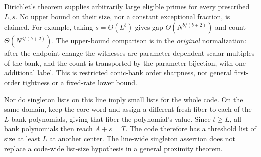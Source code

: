 Dirichlet's theorem supplies arbitrarily large eligible primes for every
prescribed $L,s$. No upper bound on their size, nor a constant exceptional
fraction, is claimed. For example, taking $s=\Theta(L^b)$ gives gap
$\Theta(N^{b/(b+2)})$ and count $\Theta(N^{3/(b+2)})$.
The upper-bound comparison is in the \emph{original} normalization:
after the endpoint change the witnesses are parameter-dependent scalar
multiples of the bank, and the count is transported by the parameter
bijection, with one additional label. This is restricted conic-bank order
sharpness, not general first-order tightness or a fixed-rate lower bound.

Nor do singleton lists on this line imply small lists for the whole code.
On the same domain, keep the core word and assign a different fresh fiber
to each of the $L$ bank polynomials, giving that fiber the polynomial's
value. Since $t\ge L$, all bank polynomials then reach $A+s=T$.
The code therefore has a threshold list of size at least $L$ at another
center. The line-wide singleton assertion does not replace a code-wide
list-size hypothesis in a general proximity theorem.
